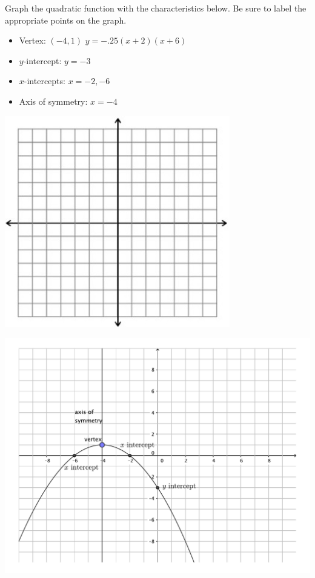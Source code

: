 \documentclass[12pt]{article}
\begin{document}
Graph the quadratic function with the characteristics below.  Be sure to label the appropriate points on the graph.
	\begin{itemize}
	\item	Vertex: $(-4,1)$  $y=-.25(x+2)(x+6)$
	\item $y$-intercept: $y=-3$ 
	\item $x$-intercepts: $x=-2,-6$
	\item Axis of symmetry: $x=-4$
	\end{itemize}
	\begin{center}\includegraphics{fig-graphpaper.png}\end{center}\begin{center}\includegraphics{fig100-18_5-a-answer}\end{center}
\end{document}
